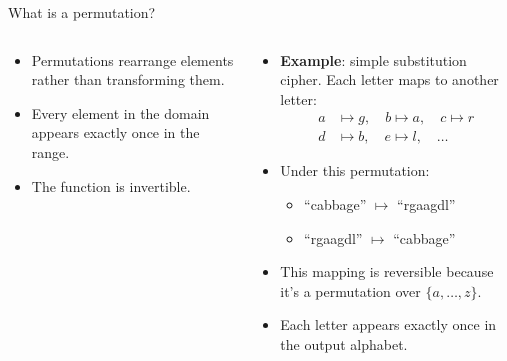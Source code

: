 \documentclass[aspectratio=169, lualatex, handout]{beamer}
\begin{document}
\begin{frame}{What is a permutation?}
	\begin{columns}[c]
		\begin{column}{0.5\textwidth}
			\begin{itemize}[<+->]
				\item Permutations rearrange elements rather than transforming them.
				\item Every element in the domain appears exactly once in the range.
				\item The function is invertible.
			\end{itemize}
		\end{column}
		\begin{column}{0.5\textwidth}
			\begin{itemize}[<+->]
				\item \textbf{Example}: simple substitution cipher. Each letter maps to another letter:
				      \begin{align*}
					      a & \mapsto g,\quad b \mapsto a,\quad c \mapsto r \\
					      d & \mapsto b,\quad e \mapsto l,\quad \ldots
				      \end{align*}
				\item Under this permutation:
				      \begin{itemize}
					      \item ``cabbage'' $\mapsto$ ``rgaagdl''
					      \item ``rgaagdl'' $\mapsto$ ``cabbage''
				      \end{itemize}
				\item This mapping is reversible because it's a permutation over $\{a,\ldots,z\}$.
				\item Each letter appears exactly once in the output alphabet.
			\end{itemize}
		\end{column}
	\end{columns}
\end{frame}
\end{document}
